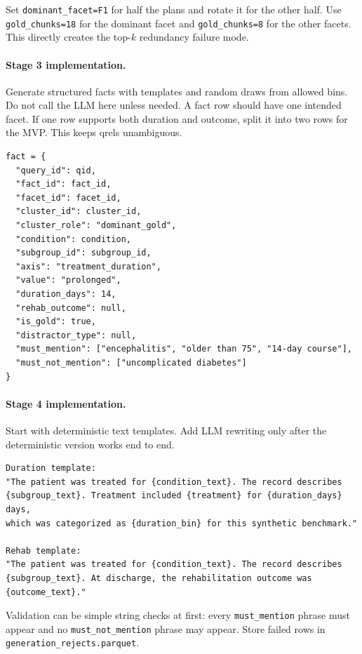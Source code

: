 \documentclass[11pt,a4paper]{article}
\newcommand{\field}[1]{\texttt{#1}}
\begin{document}
Set \field{dominant\_facet=F1} for half the plans and rotate it for the other half. Use \field{gold\_chunks=18} for the dominant facet and \field{gold\_chunks=8} for the other facets. This directly creates the top-$k$ redundancy failure mode.

\paragraph{Stage 3 implementation.}
Generate structured facts with templates and random draws from allowed bins. Do not call the LLM here unless needed. A fact row should have one intended facet. If one row supports both duration and outcome, split it into two rows for the MVP. This keeps qrels unambiguous.

\begin{lstlisting}[style=promptstyle]
fact = {
  "query_id": qid,
  "fact_id": fact_id,
  "facet_id": facet_id,
  "cluster_id": cluster_id,
  "cluster_role": "dominant_gold",
  "condition": condition,
  "subgroup_id": subgroup_id,
  "axis": "treatment_duration",
  "value": "prolonged",
  "duration_days": 14,
  "rehab_outcome": null,
  "is_gold": true,
  "distractor_type": null,
  "must_mention": ["encephalitis", "older than 75", "14-day course"],
  "must_not_mention": ["uncomplicated diabetes"]
}
\end{lstlisting}

\paragraph{Stage 4 implementation.}
Start with deterministic text templates. Add LLM rewriting only after the deterministic version works end to end.

\begin{lstlisting}[style=promptstyle]
Duration template:
"The patient was treated for {condition_text}. The record describes
{subgroup_text}. Treatment included {treatment} for {duration_days} days,
which was categorized as {duration_bin} for this synthetic benchmark."

Rehab template:
"The patient was treated for {condition_text}. The record describes
{subgroup_text}. At discharge, the rehabilitation outcome was {outcome_text}."
\end{lstlisting}

Validation can be simple string checks at first: every \field{must\_mention} phrase must appear and no \field{must\_not\_mention} phrase may appear. Store failed rows in \field{generation\_rejects.parquet}.
\end{document}
